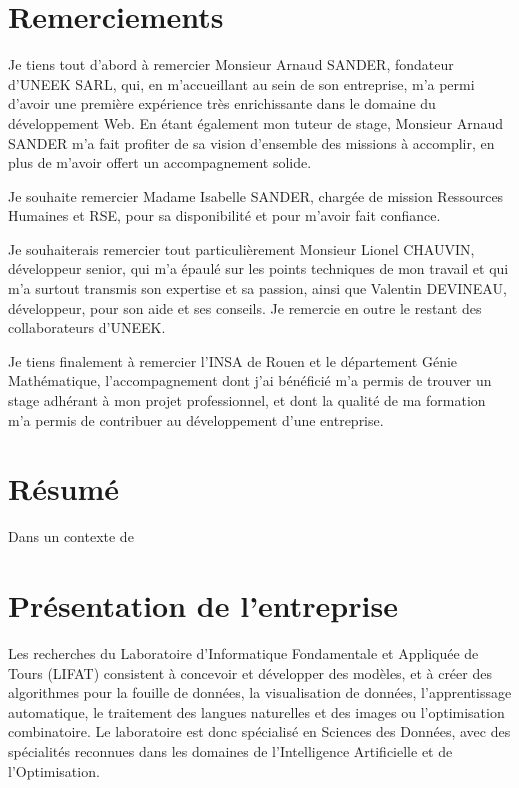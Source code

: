 \documentclass[a4paper,12pt,twoside,french]{article}
\begin{document}


\clearpage
\hfill
\clearpage

\section*{Remerciements}
Je tiens tout d’abord à remercier Monsieur Arnaud SANDER, fondateur d'UNEEK SARL, qui, en m'accueillant au sein de son entreprise, m'a permi d'avoir une première expérience très enrichissante dans le domaine du développement Web. En étant également mon tuteur de stage, Monsieur Arnaud SANDER m'a fait profiter de sa vision d'ensemble des missions à accomplir, en plus de m'avoir offert un accompagnement solide.

Je souhaite remercier Madame Isabelle SANDER, chargée de mission Ressources Humaines et RSE, pour sa disponibilité et pour m'avoir fait confiance.

Je souhaiterais remercier tout particulièrement Monsieur Lionel CHAUVIN, développeur senior, qui m’a épaulé sur les points techniques de mon travail et qui m’a surtout transmis son expertise et sa passion, ainsi que Valentin DEVINEAU, développeur, pour son aide et ses conseils. Je remercie en outre le restant des collaborateurs d'UNEEK.

Je tiens finalement à remercier l'INSA de Rouen et le département Génie Mathématique, l’accompagnement dont j’ai bénéficié m’a permis de trouver un stage adhérant à mon projet professionnel, et dont la qualité de ma formation m'a permis de contribuer au développement d'une entreprise.

\newpage

\tableofcontents
\newpage


\section{Résumé}

Dans un contexte de 



\section{Présentation de l'entreprise}

Les recherches du Laboratoire d'Informatique Fondamentale et Appliquée de Tours (LIFAT) consistent à concevoir et développer des modèles, et à créer des algorithmes pour la fouille de données, la visualisation de données, l’apprentissage automatique, le traitement des langues naturelles et des images ou l’optimisation combinatoire. Le laboratoire est donc spécialisé en Sciences des Données, avec des spécialités reconnues dans les domaines de l’Intelligence Artificielle et de l’Optimisation.
\end{document}

